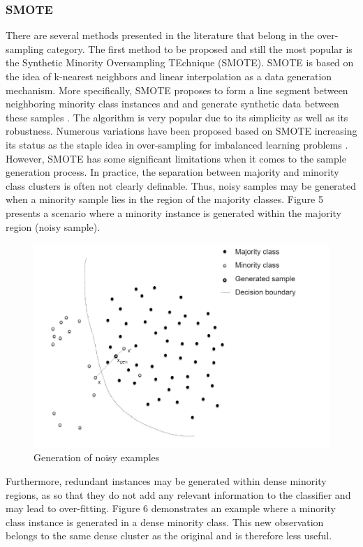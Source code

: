 \documentclass[parskip=full]{scrartcl}
\begin{document}
\subsubsection{SMOTE}

There are several methods presented in the literature that belong in the over-sampling category. The 
first method to be  proposed and still the most popular is the Synthetic Minority Oversampling 
TEchnique (SMOTE). SMOTE is based on the idea of k-nearest neighbors and linear interpolation as a 
data generation mechanism. More specifically, SMOTE proposes to form a line segment between 
neighboring minority class instances and and generate synthetic data between these samples 
\cite{Chawla.2002}. The algorithm is very popular due to its simplicity as well as its robustness. 
Numerous variations have been proposed based on SMOTE increasing its status as the staple idea in 
over-sampling for imbalanced learning problems \cite{Fernandez.2018}. However, SMOTE has some 
significant limitations when it comes to the sample generation process. In practice, the separation 
between majority and minority class clusters is often not clearly definable. Thus, noisy samples may be 
generated when a minority sample lies in the region of the majority classes. Figure 5 presents a 
scenario where a minority instance is generated within the majority region (noisy sample).

\begin{figure}[H]
	\centering
	\includegraphics[width=0.6\linewidth]{./resources/noisy_examples}
	\caption{Generation of noisy examples \cite{Douzas.2019b}}
	\label{fig:noisy-examples}
\end{figure}

Furthermore, redundant instances may be generated within dense minority regions, as so that they do 
not add any relevant information to the classifier and may lead to over-fitting. Figure 6 demonstrates 
an example where a minority  class instance is generated in a dense minority class. This new 
observation belongs to the same dense cluster as the original and is therefore less useful. 
\end{document}
